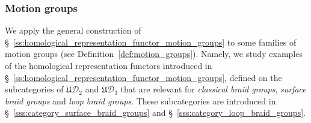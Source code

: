 \documentclass[AHL,Unicode,published]{cedram}
\newcommand{\fU}{\ensuremath{\mathfrak{U}}}
\newcommand{\cD}{\mathcal{D}}
\begin{document}
\subsubsection{Motion groups}\label{ss:applications_motion_groups}

We apply the general construction of \S~\ref{ss:homological_representation_functor_motion_groups} to some families of motion groups (see Definition~\ref{def:motion_groups}). Namely, we study examples of the homological representation functors introduced in \S~\ref{ss:homological_representation_functor_motion_groups}, defined on the subcategories of $\fU\cD_{2}$ and $\fU\cD_3$ that are relevant for \emph{classical braid groups}, \emph{surface braid groups} and \emph{loop braid groups}. These subcategories are introduced in \S~\ref{sss:category_surface_braid_groups} and \S~\ref{sss:category_loop_braid_groups}.
\end{document}
